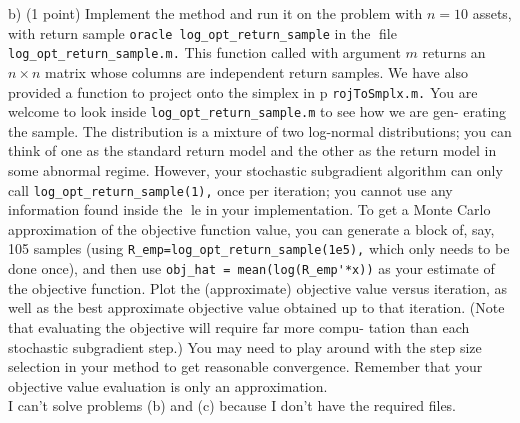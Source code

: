 \documentclass{article}
\begin{document}
b) (1 point) Implement the method and run it on the problem with $n = 10$ assets,
with return sample \verb|oracle log_opt_return_sample| in the file \verb|log_opt_return_sample.m.|
This function called with argument $m$ returns an $n \times n$ matrix whose columns
are independent return samples. We have also provided a function to project onto the simplex in p
\verb|rojToSmplx.m.|
You are welcome to look inside \verb|log_opt_return_sample.m| to see how we are gen-
erating the sample. The distribution is a mixture of two log-normal distributions;
you can think of one as the standard return model and the other as the return
model in some abnormal regime. However, your stochastic subgradient algorithm
can only call \verb|log_opt_return_sample(1),| once per iteration; you cannot use any
information found inside the le in your implementation.
To get a Monte Carlo approximation of the objective function value, you can generate a block of, say, 105 samples (using 
\verb|R_emp=log_opt_return_sample(1e5),|
which only needs to be done once), and then use 
\verb|obj_hat = mean(log(R_emp'*x))|
as your estimate of the objective function. Plot the (approximate) objective value
versus iteration, as well as the best approximate objective value obtained up to
that iteration. (Note that evaluating the objective will require far more compu-
tation than each stochastic subgradient step.)
You may need to play around with the step size selection in your method to get
reasonable convergence. Remember that your objective value evaluation is only
an approximation.	\\

I can't solve problems (b) and (c) because I don't have the required files.
\end{document}

